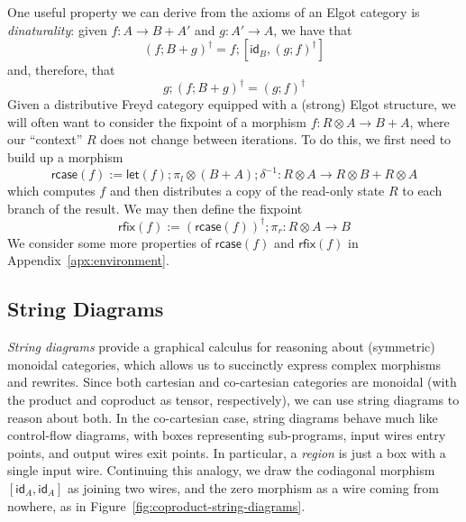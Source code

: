 \documentclass[acmsmall,screen,review]{acmart}
\newcommand{\ms}[1]{\ensuremath{\mathsf{#1}}}
\newcommand{\lmor}[1]{\ms{let}(#1)}
\newcommand{\rcase}[1]{\ms{rcase}(#1)}
\newcommand{\rfix}[1]{\ms{rfix}(#1)}
\begin{document}
One useful property we can derive from the axioms of an Elgot category is \emph{dinaturality}:
given $f: A \to B + A'$ and $g : A' \to A$, we have that
\begin{equation}
  (f ; B + g)^\dagger = f ; [\ms{id}_B, (g ; f)^\dagger]
\end{equation}
and, therefore, that
\begin{equation}
  g;(f ; B + g)^\dagger = (g ; f)^\dagger
\end{equation}
Given a distributive Freyd category equipped with a (strong) Elgot structure, we will often want to
consider the fixpoint of a morphism $f: R \otimes A \to B + A$, where our ``context'' $R$ does not
change between iterations. To do this, we first need to build up a morphism
\begin{equation}
  \rcase{f} := \lmor{f} ; \pi_l \otimes (B + A) ; \delta^{-1} 
    : R \otimes A \to R \otimes B + R \otimes A
\end{equation}
which computes $f$ and then distributes a copy of the read-only state $R$ to each branch of the
result. We may then define the fixpoint
\begin{equation}
  \rfix{f} := (\rcase{f})^\dagger ; \pi_r : R \otimes A \to B
\end{equation}
We consider some more properties of $\rcase{f}$ and $\rfix{f}$ in Appendix~\ref{apx:environment}.

\subsection{String Diagrams}

\emph{String diagrams} provide a graphical calculus for reasoning about (symmetric) monoidal
categories, which allows us to succinctly express complex morphisms and rewrites. Since both
cartesian and co-cartesian categories are monoidal (with the product and coproduct as tensor,
respectively), we can use string diagrams to reason about both. In the co-cartesian case, string
diagrams behave much like control-flow diagrams, with boxes representing sub-programs, input wires
entry points, and output wires exit points. In particular, a \emph{region} is just a box with a
single input wire. Continuing this analogy, we draw the codiagonal morphism $[\ms{id}_A, \ms{id}_A]$
as joining two wires, and the zero morphism as a wire coming from nowhere, as in
Figure~\ref{fig:coproduct-string-diagrams}. 
\end{document}
